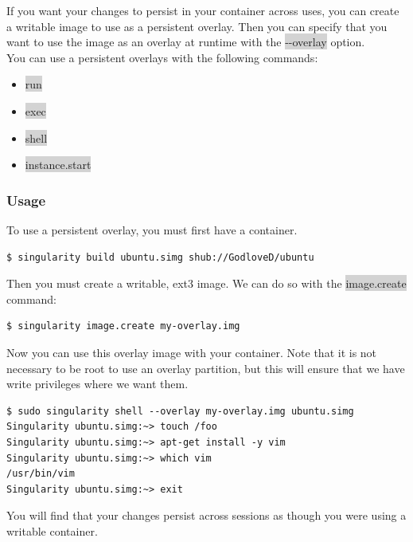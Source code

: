 \documentclass[a4paper]{article}
\begin{document}
If you want your changes to persist in your container across uses, you can create a writable image to use as a persistent overlay. Then you can specify that you want to use the image as an overlay at runtime with the  \colorbox{lightgray}{-{}-overlay} option.\\[0.1in]

You can use a persistent overlays with the following commands:

\begin{itemize}
\item  \colorbox{lightgray}{run}
\item  \colorbox{lightgray}{exec}
\item  \colorbox{lightgray}{shell}
\item  \colorbox{lightgray}{instance.start}
\end{itemize}

\subsubsection{Usage}

To use a persistent overlay, you must first have a container.

\begin{lstlisting}[frame=single]  
$ singularity build ubuntu.simg shub://GodloveD/ubuntu
\end{lstlisting}

Then you must create a writable, ext3 image. We can do so with the \colorbox{lightgray}{image.create} command:

\begin{lstlisting}[frame=single]  
$ singularity image.create my-overlay.img
\end{lstlisting}

Now you can use this overlay image with your container. Note that it is not necessary to be root to use an overlay partition, but this will ensure that we have write privileges where we want them.

\begin{lstlisting}[frame=single]  
$ sudo singularity shell --overlay my-overlay.img ubuntu.simg
Singularity ubuntu.simg:~> touch /foo
Singularity ubuntu.simg:~> apt-get install -y vim
Singularity ubuntu.simg:~> which vim
/usr/bin/vim
Singularity ubuntu.simg:~> exit
\end{lstlisting}

You will find that your changes persist across sessions as though you were using a writable container.\\[0.1in]
\end{document}
